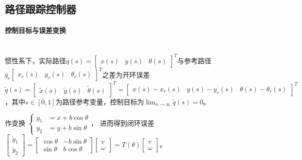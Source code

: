 \documentclass[
12pt, %
a4paper, 
oneside, %
headinclude,footinclude, %
]{scrartcl}
\begin{document}
\subsection[路径跟踪控制器]{路径跟踪控制器}
\paragraph{控制目标与误差变换}~\\

惯性系下，实际路径$ q(s) = \begin{bmatrix} x(s) & y(s) & \theta(s) \end{bmatrix}^T $与参考路径$ q_r \begin{bmatrix} x_r(s) & y_r(s) & \theta_r(s) \end{bmatrix}^T $之差为开环误差$ \tilde{q}(s) = \begin{bmatrix} \tilde{x}(s) & \tilde{y}(s) & \tilde{\theta}(s) \end{bmatrix}^T = \begin{bmatrix} x(s) - x_r(s) & y(s) - y_r(s) & \theta(s) - \theta_r(s) \end{bmatrix}^T $，其中$ s \in [0,1] $为路径参考变量，控制目标为$ \lim_{n \to \infty} \tilde{q}(s) = 0 $。

作变换%
$
\begin{cases}
y_1 &= x + b\cos\theta \\
y_2 &= y + b\sin\theta
\end{cases}
$，%
进而得到闭环误差$ \begin{bmatrix} \dot{y}_1 \\ \dot{y}_2 \end{bmatrix} = \begin{bmatrix} \cos\theta & -b\sin\theta \\ \sin\theta & b\cos\theta \end{bmatrix} \begin{bmatrix} v \\ \omega \end{bmatrix} = T(\theta) \begin{bmatrix} v \\ \omega \end{bmatrix} $。
\end{document}
